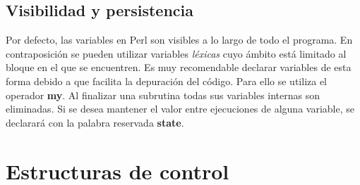 \documentclass[12pt,a4paper]{memoir} %
\begin{document}
	\section{Visibilidad y persistencia}
	Por defecto, las variables en Perl son visibles a lo largo de todo el programa. En contraposición se pueden utilizar variables \textit{léxicas} cuyo ámbito está limitado al bloque en el que se encuentren. Es muy recomendable declarar variables de esta forma debido a que facilita la depuración del código. Para ello se utiliza el operador \textbf{my}.
	Al finalizar una subrutina todas sus variables internas son eliminadas. Si se desea mantener el valor entre ejecuciones de alguna variable, se declarará con la palabra reservada \textbf{state}.
	\chapter{Estructuras de control}
\end{document}
